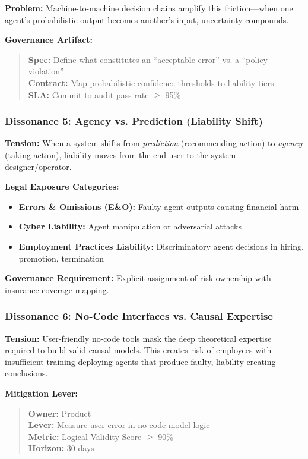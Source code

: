 \documentclass[11pt,a4paper]{article}
\begin{document}
\textbf{Problem:} Machine-to-machine decision chains amplify this friction—when one agent's probabilistic output becomes another's input, uncertainty compounds.

\textbf{Governance Artifact:}
\begin{quote}
\textbf{Spec:} Define what constitutes an ``acceptable error'' vs. a ``policy violation'' \\
\textbf{Contract:} Map probabilistic confidence thresholds to liability tiers \\
\textbf{SLA:} Commit to audit pass rate $\geq$ 95\%
\end{quote}

\subsubsection{Dissonance 5: Agency vs. Prediction (Liability Shift)}

\textbf{Tension:} When a system shifts from \textit{prediction} (recommending action) to \textit{agency} (taking action), liability moves from the end-user to the system designer/operator.

\textbf{Legal Exposure Categories:}
\begin{itemize}
\item \textbf{Errors \& Omissions (E\&O):} Faulty agent outputs causing financial harm
\item \textbf{Cyber Liability:} Agent manipulation or adversarial attacks
\item \textbf{Employment Practices Liability:} Discriminatory agent decisions in hiring, promotion, termination
\end{itemize}

\textbf{Governance Requirement:} Explicit assignment of risk ownership with insurance coverage mapping.

\subsubsection{Dissonance 6: No-Code Interfaces vs. Causal Expertise}

\textbf{Tension:} User-friendly no-code tools mask the deep theoretical expertise required to build valid causal models. This creates risk of employees with insufficient training deploying agents that produce faulty, liability-creating conclusions.

\textbf{Mitigation Lever:}
\begin{quote}
\textbf{Owner:} Product \\
\textbf{Lever:} Measure user error in no-code model logic \\
\textbf{Metric:} Logical Validity Score $\geq$ 90\% \\
\textbf{Horizon:} 30 days
\end{quote}
\end{document}
